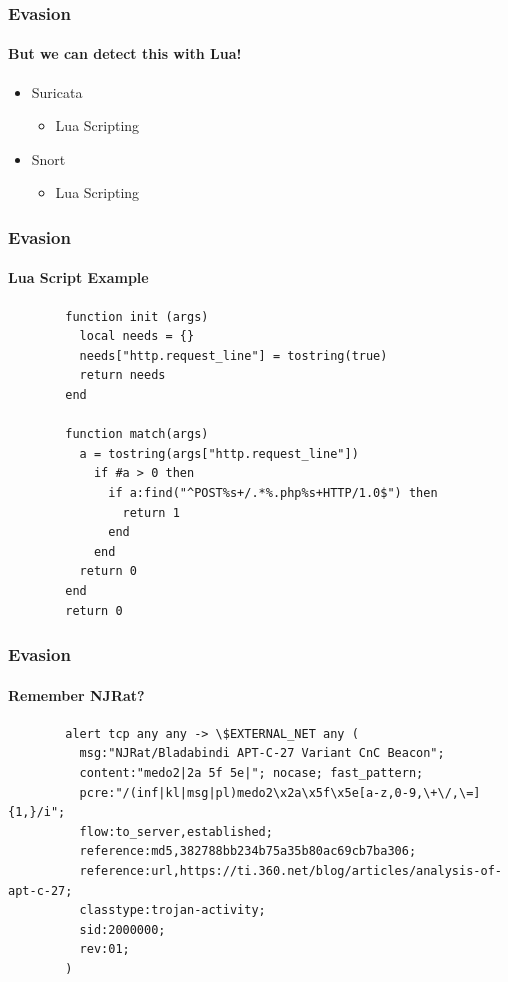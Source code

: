 \documentclass[aspectratio=169]{beamer}
\begin{document}
\begin{frame}
  \frametitle{Evasion}
  \framesubtitle{But we can detect this with Lua!}
  \begin{itemize}
  \item{Suricata}
    \begin{itemize}
    \item{Lua Scripting}
    \end{itemize}
  \item{Snort}
    \begin{itemize}
    \item{Lua Scripting}
    \end{itemize}
  \end{itemize}
\end{frame}

\begin{frame}[fragile]{}
  \frametitle{Evasion}
  \framesubtitle{Lua Script Example}
  \begin{center}
    \begin{tcolorbox}[title=alert.lua,colback=black]
    \begin{minipage}{0.5\textwidth}
      \begin{verbatim}
        function init (args)
          local needs = {}
          needs["http.request_line"] = tostring(true)
          return needs
        end

        function match(args)
          a = tostring(args["http.request_line"])
            if #a > 0 then
              if a:find("^POST%s+/.*%.php%s+HTTP/1.0$") then
                return 1
              end
            end
          return 0
        end
        return 0
      \end{verbatim}
    \end{minipage}
    \end{tcolorbox}
  \end{center}
\end{frame}

\begin{frame}[fragile]{}
  \frametitle{Evasion}
  \framesubtitle{Remember NJRat?}
  \begin{center}
    \begin{tcolorbox}[title=njrat.rules,colback=black]
    \begin{minipage}{0.5\textwidth}
      \begin{verbatim}
        alert tcp any any -> \$EXTERNAL_NET any (
          msg:"NJRat/Bladabindi APT-C-27 Variant CnC Beacon";
          content:"medo2|2a 5f 5e|"; nocase; fast_pattern;
          pcre:"/(inf|kl|msg|pl)medo2\x2a\x5f\x5e[a-z,0-9,\+\/,\=]{1,}/i";
          flow:to_server,established;
          reference:md5,382788bb234b75a35b80ac69cb7ba306;
          reference:url,https://ti.360.net/blog/articles/analysis-of-apt-c-27;
          classtype:trojan-activity;
          sid:2000000;
          rev:01;
        )
      \end{verbatim}
    \end{minipage}
    \end{tcolorbox}
  \end{center}
\end{frame}
\end{document}
